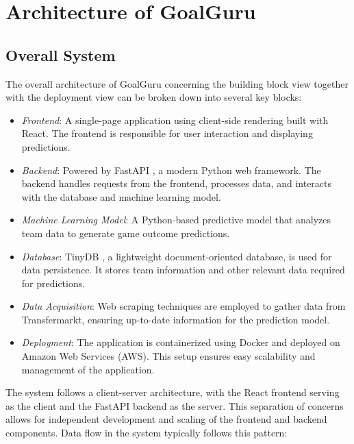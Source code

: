 \documentclass[conference,a4paper,flushend]{cs-techrep}
\begin{document}
\section{Architecture of GoalGuru} \label{architecture}


\subsection{Overall System} \label{overall} %

The overall architecture of GoalGuru concerning the building block view together with the deployment view can be broken down into several key blocks:

\begin{itemize}
\item \emph{Frontend}: A single-page application using client-side rendering built with React. The frontend is responsible for user interaction and displaying predictions.
\item \emph{Backend}: Powered by FastAPI \cite{fastapi}, a modern Python web framework. The backend handles requests from the frontend, processes data, and interacts with the database and machine learning model.
\item \emph{Machine Learning Model}: A Python-based predictive model that analyzes team data to generate game outcome predictions.
\item \emph{Database}: TinyDB \cite{noauthor_welcome_nodate}, a lightweight document-oriented database, is used for data persistence. It stores team information and other relevant data required for predictions.
\item \emph{Data Acquisition}: Web scraping techniques are employed to gather data from Transfermarkt, ensuring up-to-date information for the prediction model.
\item \emph{Deployment}: The application is containerized using Docker and deployed on Amazon Web Services (AWS). This setup ensures easy scalability and management of the application.
\end{itemize}
    

The system follows a client-server architecture, with the React frontend serving as the client and the FastAPI backend as the server. This separation of concerns allows for independent development and scaling of the frontend and backend components. Data flow in the system typically follows this pattern:
\end{document}
